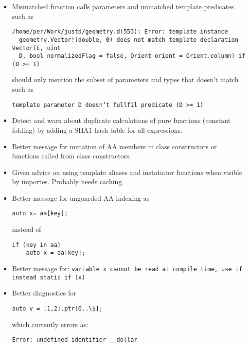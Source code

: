 \documentclass[xcolor=dvipsnames, twocolumn]{article}
\begin{document}
\begin{itemize}

\item Mismatched function calls parameters and unmatched template predicates such as

\begin{lstlisting}[frame=single]
/home/per/Work/justd/geometry.d(553): Error: template instance
  geometry.Vector!(double, 0) does not match template declaration Vector(E, uint
  D, bool normalizedFlag = false, Orient orient = Orient.column) if (D >= 1)
\end{lstlisting}

should only mention the subset of parameters and types that doesn't match such as

\begin{lstlisting}[frame=single]
template parameter D doesn’t fullfil predicate (D >= 1)
\end{lstlisting}

\item Detect and warn about duplicate calculations of pure functions (constant
  folding) by adding a SHA1-hash table for all expressions.
\item Better message for mutation of AA members in class constructors or
  functions called from class constructors.

\item Given advice on using template aliases and instatiator functions when
  visible by importes. Probably needs caching.

\item Better message for unguarded AA indexing as
\begin{lstlisting}[frame=single]
auto x= aa[key];
\end{lstlisting}
instead of
\begin{lstlisting}[frame=single]
if (key in aa)
    auto x = aa[key];
\end{lstlisting}

\item Better message for:
\texttt{variable x cannot be read at compile time, use if instead static if (x)}

\item Better diagnostics for
\begin{lstlisting}[frame=single]
auto v = [1,2].ptr[0..\$];
\end{lstlisting}
which currently errors as:
\begin{lstlisting}[frame=single]
Error: undefined identifier __dollar
\end{lstlisting}

\end{itemize}
\end{document}
